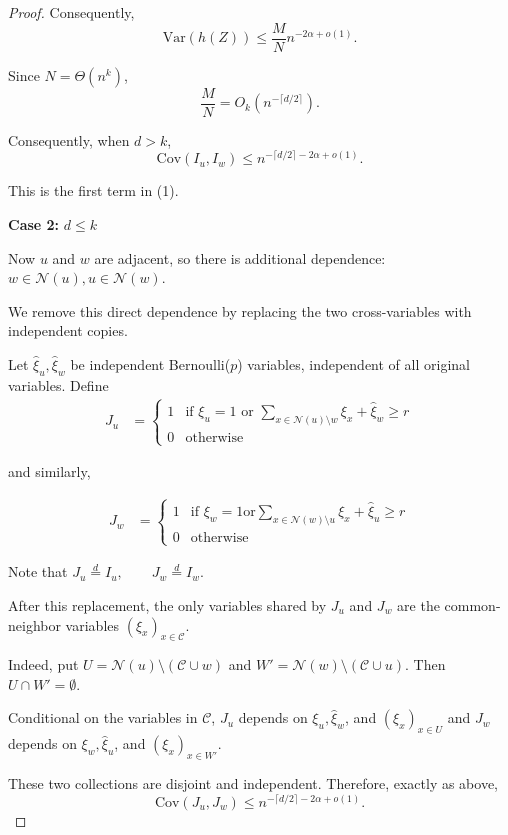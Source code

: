 \documentclass[10pt,a4paper]{amsart}
\renewcommand{\ge}{\geqslant}
\renewcommand{\le}{\leqslant}
\renewcommand{\leq}{\leqslant}
\begin{document}
\begin{proof}
Consequently, 
$$\text{Var}(h(Z)) \le \frac{M}{N}n^{-2\alpha+o(1)}.$$


Since $N=\Theta(n^k)$,
$$\frac {M}{N} =O_k\left(n^{-\lceil d/2\rceil}\right).$$


Consequently, when $d>k$, 
$$
\text{Cov}(I_u,I_w)
\le
n^{-\lceil d/2\rceil-2\alpha+o(1)}.$$

This is the first term in (1).

\textbf{Case 2:} $d\leq k$

Now $u$ and $w$ are adjacent, so there is additional dependence:
$
w\in \mathcal{N}(u), u\in \mathcal{N}(w).
$

We remove this direct dependence by replacing the two cross-variables with independent copies.

Let $\widehat\xi_u,\widehat\xi_w$ be independent Bernoulli($p$) variables, independent of all original variables. Define
\begin{align*}
J_u &= 
\begin{cases}
1 & \text{if 
$\xi_u=1$ or 
$\sum_{x \in \mathcal{N}(u) \setminus w}\xi_x
+\widehat\xi_w
\ge r$} \\
0 & \text{otherwise}
\end{cases}
\end{align*}

and similarly, 

\begin{align*}
J_w &=
\begin{cases}
1 & \text{if 
$\xi_w=1$
or
$\sum_{x\in \mathcal{N}(w)\setminus{u}}\xi_x
+\widehat\xi_u
\ge r$} \\
0 & \text{otherwise}
\end{cases}
\end{align*}

Note that  $J_u\overset d=I_u,
\qquad
J_w\overset d=I_w.$


After this replacement, the only variables shared by $J_u$ and $J_w$ are the common-neighbor variables $(\xi_x)_{x\in\mathcal C}$.

Indeed, put $U=\mathcal{N}(u)\setminus(\mathcal C\cup{w})$ and $W'=\mathcal{N}(w)\setminus(\mathcal C\cup{u})$. Then $U\cap W'=\emptyset$. 

Conditional on the variables in $\mathcal C$, $J_u$ depends on $\xi_u,\widehat\xi_w$, and $(\xi_x)_{x\in U}$ and $J_w$ depends on $\xi_w,\widehat\xi_u$, and $(\xi_x)_{x\in W'}$.

These two collections are disjoint and independent. Therefore, exactly as above,
$$
\text{Cov}(J_u,J_w)
\le
n^{-\lceil d/2\rceil-2\alpha+o(1)}.
$$


\end{proof}
\end{document}
